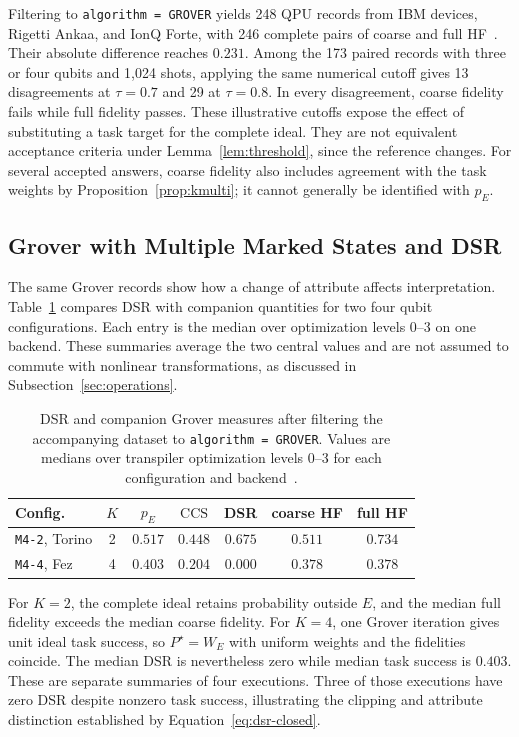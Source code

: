 \documentclass[10pt,conference]{IEEEtran}
\newcommand{\CCS}{\mathrm{CCS}}
\begin{document}
Filtering to \texttt{algorithm = GROVER} yields 248 QPU records from IBM devices, Rigetti Ankaa, and IonQ Forte, with 246 complete pairs of coarse and full HF~\cite{qwardGroverData2026}. Their absolute difference reaches $0.231$. Among the 173 paired records with three or four qubits and 1,024 shots, applying the same numerical cutoff gives 13 disagreements at $\tau=0.7$ and 29 at $\tau=0.8$. In every disagreement, coarse fidelity fails while full fidelity passes. These illustrative cutoffs expose the effect of substituting a task target for the complete ideal. They are not equivalent acceptance criteria under Lemma~\ref{lem:threshold}, since the reference changes. For several accepted answers, coarse fidelity also includes agreement with the task weights by Proposition~\ref{prop:kmulti}; it cannot generally be identified with $p_E$.

\subsection{Grover with Multiple Marked States and DSR}
\label{sec:grover-multimarked}

The same Grover records show how a change of attribute affects interpretation. Table~\ref{tab:grover-multi} compares DSR with companion quantities for two four qubit configurations. Each entry is the median over optimization levels 0--3 on one backend. These summaries average the two central values and are not assumed to commute with nonlinear transformations, as discussed in Subsection~\ref{sec:operations}.

\begin{table}[ht]
\centering
\caption{DSR and companion Grover measures after filtering the accompanying dataset to \texttt{algorithm = GROVER}. Values are medians over transpiler optimization levels 0--3 for each configuration and backend~\cite{qwardGroverData2026}.}
\label{tab:grover-multi}
\renewcommand{\arraystretch}{1.1}
\begin{tabular}{@{}lcccccc@{}}
\toprule
\textbf{Config.} & $K$ & $p_E$ & $\CCS$ & DSR & coarse HF & full HF \\
\midrule
\texttt{M4-2}, Torino & 2 & $0.517$ & $0.448$ & $0.675$ & $0.511$ & $0.734$ \\
\texttt{M4-4}, Fez & 4 & $0.403$ & $0.204$ & $0.000$ & $0.378$ & $0.378$ \\
\bottomrule
\end{tabular}
\end{table}

For $K=2$, the complete ideal retains probability outside $E$, and the median full fidelity exceeds the median coarse fidelity. For $K=4$, one Grover iteration gives unit ideal task success, so $P^{\star}=W_E$ with uniform weights and the fidelities coincide. The median DSR is nevertheless zero while median task success is $0.403$. These are separate summaries of four executions. Three of those executions have zero DSR despite nonzero task success, illustrating the clipping and attribute distinction established by Equation~\ref{eq:dsr-closed}.
\end{document}
